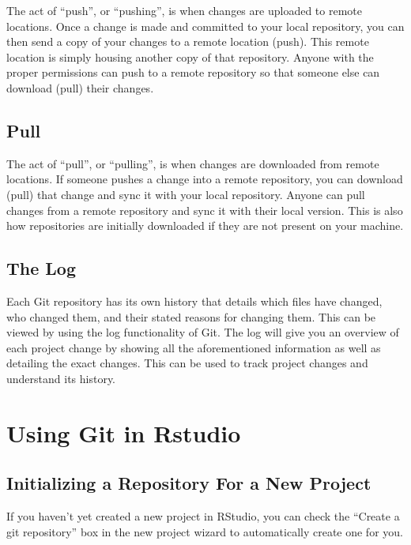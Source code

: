 \documentclass[
]{book}
\begin{document}
The act of ``push'', or ``pushing'', is when changes are uploaded to remote locations. Once a change is made and committed to your local repository, you can then send a copy of your changes to a remote location (push). This remote location is simply housing another copy of that repository. Anyone with the proper permissions can push to a remote repository so that someone else can download (pull) their changes.

\hypertarget{pull}{%
\section{Pull}\label{pull}}

The act of ``pull'', or ``pulling'', is when changes are downloaded from remote locations. If someone pushes a change into a remote repository, you can download (pull) that change and sync it with your local repository. Anyone can pull changes from a remote repository and sync it with their local version. This is also how repositories are initially downloaded if they are not present on your machine.

\hypertarget{the-log}{%
\section{The Log}\label{the-log}}

Each Git repository has its own history that details which files have changed, who changed them, and their stated reasons for changing them. This can be viewed by using the log functionality of Git. The log will give you an overview of each project change by showing all the aforementioned information as well as detailing the exact changes. This can be used to track project changes and understand its history.

\hypertarget{using-git-in-rstudio}{%
\chapter{Using Git in Rstudio}\label{using-git-in-rstudio}}

\hypertarget{initializing-a-repository-for-a-new-project}{%
\section{Initializing a Repository For a New Project}\label{initializing-a-repository-for-a-new-project}}

If you haven't yet created a new project in RStudio, you can check the ``Create a git repository'' box in the new project wizard to automatically create one for you.
\end{document}
